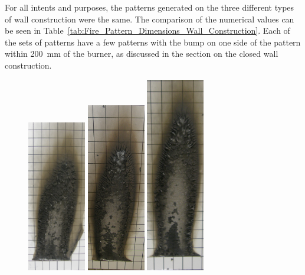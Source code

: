 \documentclass[twoside]{uocthesis}
\begin{document}
{For all intents and purposes, the patterns generated on the three different types of wall construction were the same.  The comparison of the numerical values can be seen in Table~\ref{tab:Fire_Pattern_Dimensions_Wall_Construction}.  Each of the sets of 
patterns have a few patterns with the bump on one side of the pattern within 200~mm of the burner, as discussed in the section on the closed wall construction.     

\begin{figure}[p]
	\includegraphics[width=1.0in]{../Figures/GBNG1_P5120006}
	\includegraphics[width=1.0in]{../Figures/GBNG2_P5120024}
	\includegraphics[width=1.0in]{../Figures/GBNG3_P5120048}

\end{figure}}
\end{document}
